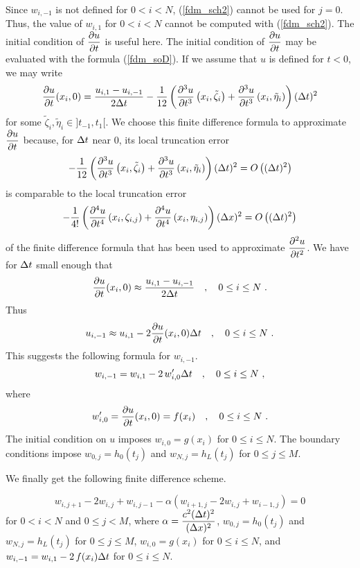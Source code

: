 Since $w_{i,-1}$ is not defined for $0<i<N$, (\ref{fdm_sch2}) cannot
be used for $j=0$.  Thus, the value of $w_{i,1}$ for $0<i<N$ cannot
be computed with (\ref{fdm_sch2}).  The initial condition of
$\displaystyle \frac{\partial{u}}{\partial{t}}$ is useful here.  The initial condition of
$\displaystyle \frac{\partial{u}}{\partial{t}}$ may be evaluated with the formula
(\ref{fdm_soD}).  If we assume that $u$ is defined for $t<0$, we may
write
\[
\frac{\partial{u}}{\partial{t}}(x_i,0) = \frac{u_{i,1}- u_{i,-1}}{2\Delta{t}}
- \frac{1}{12} \left( \frac{\partial^{3}{u}}{\partial{t}^{3}}\left(x_i,\tilde{\zeta}_i\right)
+ \frac{\partial^{3}{u}}{\partial{t}^{3}}\left(x_i,\tilde{\eta}_i\right)\right) (\Delta{t})^2
\]
for some $\tilde{\zeta}_i, \tilde{\eta}_i \in ]t_{-1},t_1[$.  We choose this
finite difference formula to approximate $\displaystyle \frac{\partial{u}}{\partial{t}}$
because, for $\Delta{t}$ near $0$, its local truncation error
\[
- \frac{1}{12} \left( \frac{\partial^{3}{u}}{\partial{t}^{3}}\left(x_i,\tilde{\zeta}_i\right)
+ \frac{\partial^{3}{u}}{\partial{t}^{3}}\left(x_i,\tilde{\eta}_i\right)\right) (\Delta{t})^2
= O\left((\Delta{t})^2\right)
\]
is comparable to the local truncation error
\[
- \frac{1}{4!} \left( \frac{\partial^{4}{u}}{\partial{t}^{4}}\left(x_i,\zeta_{i,j} \right)
+ \frac{\partial^{4}{u}}{\partial{t}^{4}}\left(x_i,\eta_{i,j} \right) \right) (\Delta{x})^2
= O\left((\Delta{t})^2\right)
\]
of the finite difference formula that has been
used to approximate $\displaystyle \frac{\partial^{2}{u}}{\partial{t}^{2}}$.  We have for
$\Delta{t}$ small enough that
\[
\frac{\partial{u}}{\partial{t}}(x_i,0) \approx \frac{u_{i,1}- u_{i,-1}}{2\Delta{t}}
\quad , \quad 0 \leq i \leq N \ .
\]
Thus
\[
u_{i,-1} \approx u_{i,1} - 2 \frac{\partial{u}}{\partial{t}}(x_i,0) \Delta{t} \quad ,
\quad 0 \leq i \leq N \ .
\]
This suggests the following formula for $w_{i,-1}$.
\[
w_{i,-1} = w_{i,1} - 2 \,w_{i,0}'\Delta{t} \quad , \quad 0 \leq i \leq N \ ,
\]
where
\[
w_{i,0}' = \frac{\partial{u}}{\partial{t}}(x_i,0) = f(x_i) \quad , \quad 0 \leq i \leq N \ .
\]
The initial condition on $u$ imposes $w_{i,0} = g(x_i)$ for $0 \leq i \leq N$.
The boundary conditions impose $w_{0,j} = h_0(t_j)$ and $w_{N,j} = h_L(t_j)$
for $0\leq j \leq M$.

We finally get the following finite difference scheme.

\begin{algo} \label{fdm_sch3S}
\[
w_{i,j+1} - 2w_{i,j} + w_{i,j-1} - \alpha \left( w_{i+1,j} - 2w_{i,j} +
w_{i-1,j}\right) = 0
\]
for $0 < i < N$ and $0 \leq j < M$, where
$\displaystyle \alpha = \frac{c^2(\Delta{t})^2}{(\Delta{x})^2}$,
$w_{0,j} = h_0(t_j)$ and $w_{N,j} = h_L(t_j)$ for $0\leq j \leq M$,
$w_{i,0} = g(x_i)$ for $0 \leq i \leq N$, and
$w_{i,-1} = w_{i,1} - 2\,f(x_i)\Delta{t}$ for $0 \leq i \leq N$.
\end{algo}

